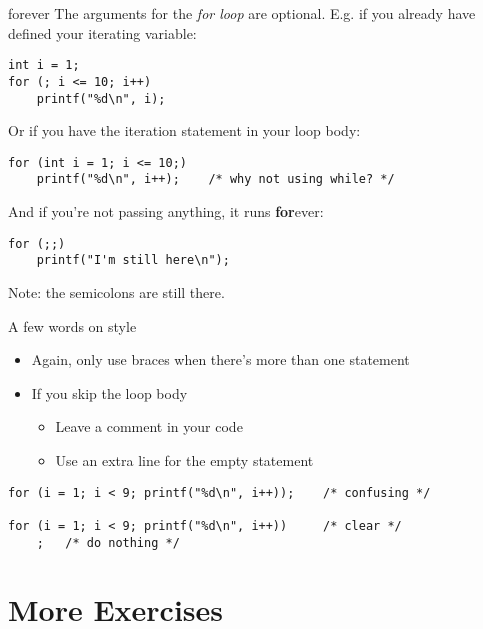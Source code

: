\begin{frame}[fragile]{forever}
	The arguments for the \textit{for loop} are optional. E.g. if you already have defined your iterating variable:
	\begin{lstlisting}[numbers=none]
int i = 1;
for (; i <= 10; i++)
	printf("%d\n", i);
\end{lstlisting}
	Or if you have the iteration statement in your loop body:
	\begin{lstlisting}[numbers=none]
for (int i = 1; i <= 10;)
	printf("%d\n", i++);	/* why not using while? */
\end{lstlisting}
	And if you're not passing anything, it runs \textbf{for}ever:
	\begin{lstlisting}[numbers=none]
for (;;)
	printf("I'm still here\n");
\end{lstlisting}
Note: the semicolons are still there.
\end{frame}
\begin{frame}[fragile]{A few words on style}
	\begin{itemize}
		\item Again, only use braces when there's more than one statement
		\item If you skip the loop body
		\begin{itemize}
			\item Leave a comment in your code
			\item Use an extra line for the empty statement
		\end{itemize}
	\end{itemize}
		\begin{lstlisting}[numbers=none]
for (i = 1; i < 9; printf("%d\n", i++));	/* confusing */

for (i = 1; i < 9; printf("%d\n", i++))		/* clear */
	;	/* do nothing */
\end{lstlisting}
\end{frame}
\section{More Exercises}
